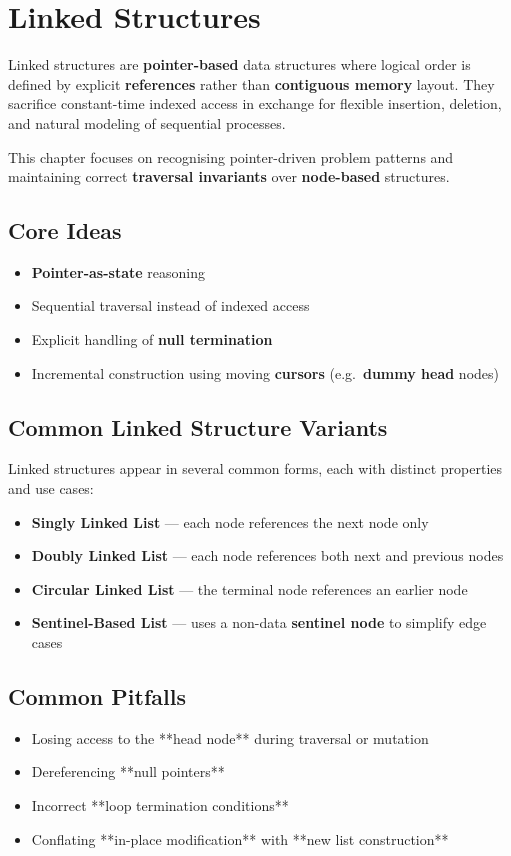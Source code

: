 \section{Linked Structures}

Linked structures are \textbf{pointer-based} data structures where logical order is
defined by explicit \textbf{references} rather than \textbf{contiguous memory} layout.
They sacrifice constant-time indexed access in exchange for flexible
insertion, deletion, and natural modeling of sequential processes.

This chapter focuses on recognising pointer-driven problem patterns and
maintaining correct \textbf{traversal invariants} over \textbf{node-based} structures.

\subsection*{Core Ideas}
\begin{itemize}[nosep]
  \item \textbf{Pointer-as-state} reasoning
  \item Sequential traversal instead of indexed access
  \item Explicit handling of \textbf{null termination}
  \item Incremental construction using moving \textbf{cursors} (e.g.\ \textbf{dummy head} nodes)
\end{itemize}

\subsection*{Common Linked Structure Variants}
Linked structures appear in several common forms, each with distinct
properties and use cases:

\begin{itemize}[nosep]
  \item \textbf{Singly Linked List} — each node references the next node only
  \item \textbf{Doubly Linked List} — each node references both next and previous nodes
  \item \textbf{Circular Linked List} — the terminal node references an earlier node
  \item \textbf{Sentinel-Based List} — uses a non-data \textbf{sentinel node} to simplify edge cases
\end{itemize}

\subsection*{Common Pitfalls}
\begin{itemize}[nosep]
  \item Losing access to the **head node** during traversal or mutation
  \item Dereferencing **null pointers**
  \item Incorrect **loop termination conditions**
  \item Conflating **in-place modification** with **new list construction**
\end{itemize}


